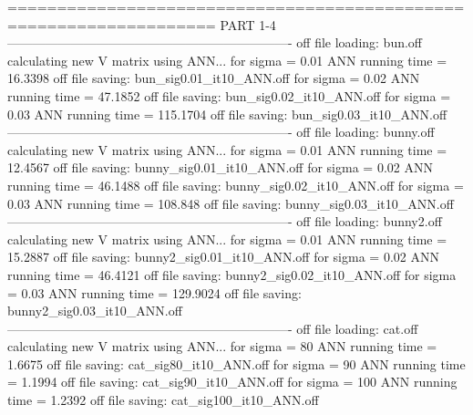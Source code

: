 \documentclass[paper=a4, fontsize=11pt]{scrartcl} %
\numberwithin{equation}{section} %
\numberwithin{figure}{section} %
\numberwithin{table}{section} %
\begin{document}
===================================================================
PART 1-4
-------------------------------------------------------------------
off file loading: bun.off
calculating new V matrix using ANN...
for sigma = 0.01
ANN running time = 16.3398
off file saving: bun_sig0.01_it10_ANN.off
for sigma = 0.02
ANN running time = 47.1852
off file saving: bun_sig0.02_it10_ANN.off
for sigma = 0.03
ANN running time = 115.1704
off file saving: bun_sig0.03_it10_ANN.off
-------------------------------------------------------------------
off file loading: bunny.off
calculating new V matrix using ANN...
for sigma = 0.01
ANN running time = 12.4567
off file saving: bunny_sig0.01_it10_ANN.off
for sigma = 0.02
ANN running time = 46.1488
off file saving: bunny_sig0.02_it10_ANN.off
for sigma = 0.03
ANN running time = 108.848
off file saving: bunny_sig0.03_it10_ANN.off
-------------------------------------------------------------------
off file loading: bunny2.off
calculating new V matrix using ANN...
for sigma = 0.01
ANN running time = 15.2887
off file saving: bunny2_sig0.01_it10_ANN.off
for sigma = 0.02
ANN running time = 46.4121
off file saving: bunny2_sig0.02_it10_ANN.off
for sigma = 0.03
ANN running time = 129.9024
off file saving: bunny2_sig0.03_it10_ANN.off
-------------------------------------------------------------------
off file loading: cat.off
calculating new V matrix using ANN...
for sigma = 80
ANN running time = 1.6675
off file saving: cat_sig80_it10_ANN.off
for sigma = 90
ANN running time = 1.1994
off file saving: cat_sig90_it10_ANN.off
for sigma = 100
ANN running time = 1.2392
off file saving: cat_sig100_it10_ANN.off
\end{document}
